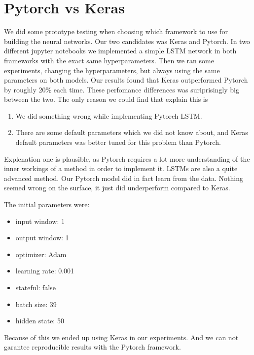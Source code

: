 \section{Pytorch vs Keras}
We did some prototype testing when choosing which framework to use for
building the neural networks.
Our two candidates was Keras and Pytorch.
In two different jupyter notebooks
we implemented a simple LSTM network in both frameworks with the exact same
hyperparameters. Then we ran some experiments, changing the hyperparameters,
but always using the same parameters on both models.
Our results found that Keras outperformed Pytorch by roughly 20\% each time.
These perfomance differences was suriprisingly big between the two.
The only reason we could find that explain this is
\begin{enumerate}
  \item We did something wrong while implementing Pytorch LSTM.
  \item There are some default parameters which we did not know about, and Keras
        default parameters was better tuned for this problem than Pytorch.
\end{enumerate}
Explenation one is plausible, as Pytorch requires a lot more understanding
of the inner workings of a method in order to implement it.
LSTMs are also a quite advanced method. Our Pytorch model did in fact learn
from the data. Nothing seemed wrong on the surface, it just did underperform compared to Keras.

The initial parameters were:
\begin{itemize}
  \item input window: 1
  \item output window: 1
  \item optimizer: Adam
  \item learning rate: 0.001
  \item stateful: false
  \item batch size: 39
  \item hidden state: 50
\end{itemize}
Because of this we ended up using Keras in our experiments. And we can not
garantee reproducible results with the Pytorch framework.